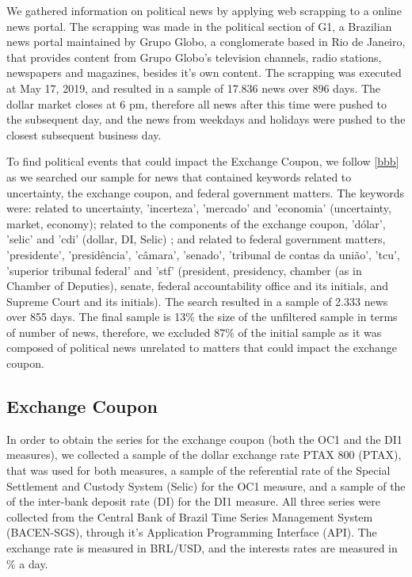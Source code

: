\documentclass[cic,tc, english]{iiufrgs}
\begin{document}
    We gathered information on political news by applying web scrapping to a online news portal. The scrapping was made in the political section of G1, a Brazilian news portal maintained by Grupo Globo, a conglomerate based in Rio de Janeiro, that provides content from Grupo Globo's television channels, radio stations, newspapers and magazines, besides it's own content. The scrapping was executed at May 17, 2019, and resulted in a sample of 17.836 news over 896 days. The dollar market closes at 6 pm, therefore all news after this time were pushed to the subsequent day, and the news from weekdays and holidays were pushed to the closest subsequent business day.

    To find political events that could impact the Exchange Coupon, we follow \ref{bbb} as we searched our sample for news that contained keywords related to uncertainty, the exchange coupon, and federal government matters. The keywords were: related to uncertainty, 'incerteza', 'mercado' and 'economia' (uncertainty, market, economy); related to the components of the exchange coupon, 'dólar', 'selic' and 'cdi' (dollar, DI, Selic) ; and related to federal government matters, 'presidente', 'presidência', 'câmara', 'senado', 'tribunal de contas da união', 'tcu', 'superior tribunal federal' and 'stf' (president, presidency, chamber (as in Chamber of Deputies), senate, federal accountability office and its initials, and Supreme Court and its initials). The search resulted in a sample of 2.333 news over 855 days. The final sample is 13\% the size of the unfiltered sample in terms of number of news, therefore, we excluded 87\% of the initial sample as it was composed of political news unrelated to matters that could impact the exchange coupon.

\subsection{Exchange Coupon} \label{chapter_exchange_coupon}

    In order to obtain the series for the exchange coupon (both the OC1 and the DI1 measures), we collected a sample of the dollar exchange rate PTAX 800 (PTAX), that was used for both measures, a sample of the referential rate of the Special Settlement and Custody System (Selic) for the OC1 measure, and a sample of the of the inter-bank deposit rate (DI) for the DI1 measure. All three series were collected from the Central Bank of Brazil Time Series Management System (BACEN-SGS), through it's Application Programming Interface (API). The exchange rate is measured in BRL/USD, and the interests rates are measured in \% a day.
    
\end{document}
